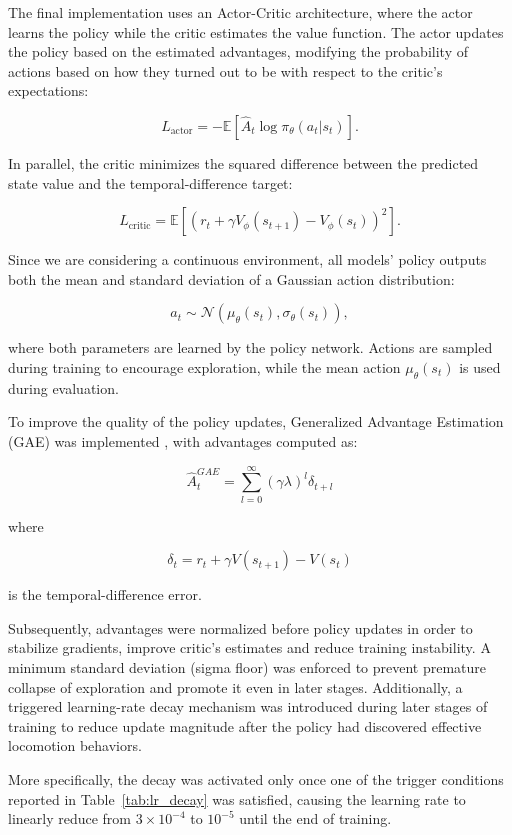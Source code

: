 The final implementation uses an Actor-Critic architecture, where the actor learns the policy while the critic estimates
the value function. The actor updates the policy based on the estimated advantages, modifying the probability of actions
based on how they turned out to be with respect to the critic’s expectations:

\[
L_{\text{actor}} = -\mathbb{E}\left[\hat A_t \log \pi_\theta(a_t|s_t)\right].
\]

In parallel, the critic minimizes the squared difference between the predicted state value and the temporal-difference target:

\[
L_{\text{critic}} = \mathbb{E}\left[\left(r_t+\gamma V_\phi(s_{t+1})-V_\phi(s_t)\right)^2\right].
\]

Since we are considering a continuous environment, all models' policy outputs both the mean and standard
deviation of a Gaussian action distribution:

\[
a_t \sim \mathcal N(\mu_\theta(s_t), \sigma_\theta(s_t)),
\]

where both parameters are learned by the policy network. Actions are sampled during training to encourage exploration,
while the mean action $\mu_\theta(s_t)$ is used during evaluation.

To improve the quality of the policy updates, Generalized Advantage Estimation (GAE)
was implemented \cite{SchulmanGAE2015}, with advantages computed as:

\[
\hat A_t^{GAE} = \sum_{l=0}^{\infty} (\gamma\lambda)^l \delta_{t+l}
\]

where

\[
\delta_t = r_t + \gamma V(s_{t+1}) - V(s_t)
\]

is the temporal-difference error.


Subsequently, advantages were normalized before policy updates in order to stabilize gradients,
improve critic's estimates and reduce training instability. A minimum standard deviation (sigma floor)
was enforced to prevent premature collapse of exploration and promote it even in later stages.
Additionally, a triggered learning-rate decay mechanism was introduced during later stages of training to reduce
update magnitude after the policy had discovered effective locomotion behaviors.


More specifically, the decay was activated only once one of the trigger conditions reported in Table~\ref{tab:lr_decay}
was satisfied, causing the learning rate to linearly reduce from $3 \times 10^{-4}$ to $10^{-5}$ until the end of training.


